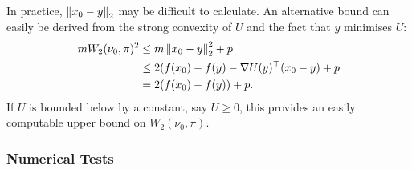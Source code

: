 \begin{note}
    In practice, $\norm{x_0-y}_2$ may be difficult to calculate.  An alternative bound can easily be derived from the strong convexity of $U$ and the fact that $y$ minimises $U$:
    \begin{align*}
        m W_2(\nu_0, \pi)^2 &\leq m \norm{x_0-y}_2^2 + p\\
        &\leq 2(f(x_0) - f(y) - \nabla U(y)^{\top}(x_0-y) + p\\
        &= 2(f(x_0)-f(y))+p.
    \end{align*}
    If $U$ is bounded below by a constant, say $U \geq 0$, this provides an easily computable upper bound on $W_2(\nu_0, \pi)$.
\end{note}

\subsubsection{Numerical Tests}
